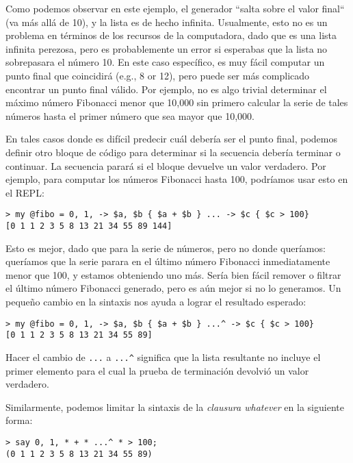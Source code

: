 Como podemos observar en este ejemplo, el generador ``salta sobre
el valor final`` (va más allá de 10), y la lista es de hecho 
infinita. Usualmente, esto no es un problema en términos
de los recursos de la computadora, dado que es una lista
infinita perezosa, pero es probablemente un error si esperabas
que la lista no sobrepasara el número 10. En este caso específico,
es muy fácil computar un punto final que coincidirá (e.g., 8 or 12),
pero puede ser más complicado encontrar un punto final válido.
Por ejemplo, no es algo trivial determinar el máximo número Fibonacci menor
que 10,000 sin primero calcular la serie de tales números hasta el
primer número que sea mayor que 10,000.

En tales casos donde es difícil predecir cuál debería ser el punto final,
podemos definir otro bloque de código para determinar si la 
secuencia debería terminar o continuar. La secuencia parará
si el bloque devuelve un valor verdadero. Por ejemplo, para 
computar los números Fibonacci hasta 100, podríamos usar esto
en el REPL:

\begin{verbatim}
> my @fibo = 0, 1, -> $a, $b { $a + $b } ... -> $c { $c > 100}
[0 1 1 2 3 5 8 13 21 34 55 89 144]
\end{verbatim}

Esto es mejor, dado que para la serie de números, pero no donde 
queríamos: queríamos que la serie parara en el último número
Fibonacci inmediatamente menor que 100, y estamos obteniendo
uno más. Sería bien fácil remover o filtrar el último número 
Fibonacci generado, pero es aún mejor si no lo generamos.
Un pequeño cambio en la sintaxis nos ayuda a lograr el resultado
esperado:

\begin{verbatim}
> my @fibo = 0, 1, -> $a, $b { $a + $b } ...^ -> $c { $c > 100}
[0 1 1 2 3 5 8 13 21 34 55 89]
\end{verbatim}

Hacer el cambio de \verb|...| a \verb|...^| significa que la lista
resultante no incluye el primer elemento para el cual la 
prueba de terminación devolvió un valor verdadero.

Similarmente, podemos limitar la sintaxis de la 
\emph{clausura whatever} en la siguiente forma:

\begin{verbatim}
> say 0, 1, * + * ...^ * > 100;
(0 1 1 2 3 5 8 13 21 34 55 89)
\end{verbatim}

